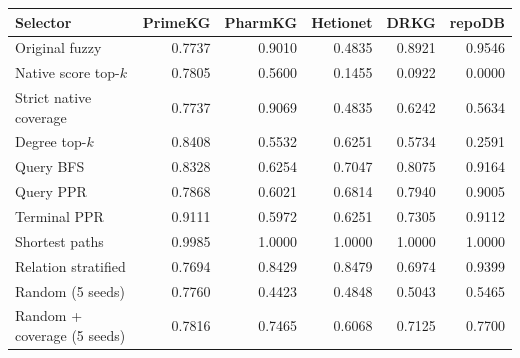 \begin{tabular}{lrrrrr}
\toprule
Selector & PrimeKG & PharmKG & Hetionet & DRKG & repoDB \\
\midrule
Original fuzzy & 0.7737 & 0.9010 & 0.4835 & 0.8921 & 0.9546 \\
Native score top-$k$ & 0.7805 & 0.5600 & 0.1455 & 0.0922 & 0.0000 \\
Strict native coverage & 0.7737 & 0.9069 & 0.4835 & 0.6242 & 0.5634 \\
Degree top-$k$ & 0.8408 & 0.5532 & 0.6251 & 0.5734 & 0.2591 \\
Query BFS & 0.8328 & 0.6254 & 0.7047 & 0.8075 & 0.9164 \\
Query PPR & 0.7868 & 0.6021 & 0.6814 & 0.7940 & 0.9005 \\
Terminal PPR & 0.9111 & 0.5972 & 0.6251 & 0.7305 & 0.9112 \\
Shortest paths & 0.9985 & 1.0000 & 1.0000 & 1.0000 & 1.0000 \\
Relation stratified & 0.7694 & 0.8429 & 0.8479 & 0.6974 & 0.9399 \\
Random (5 seeds) & 0.7760 & 0.4423 & 0.4848 & 0.5043 & 0.5465 \\
Random + coverage (5 seeds) & 0.7816 & 0.7465 & 0.6068 & 0.7125 & 0.7700 \\
\bottomrule
\end{tabular}
